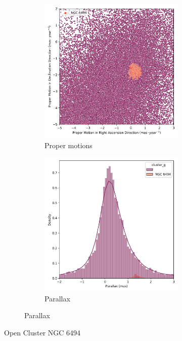 \documentclass[11pt, a4paper, english]{book}
\begin{document}
\begin{figure}[htbp]
  \centering
  \begin{subfigure}{0.9\textwidth}
    \centering
    \begin{subfigure}[t]{0.45\textwidth}
      \centering
      \includegraphics[width=\textwidth]{../figures/ngc_6494/pm_ngc_6494.png}
      \caption{Proper motions}
      \label{fig:pm_ngc_6494}
    \end{subfigure}
    \hfill
    \begin{subfigure}[t]{0.45\textwidth}
      \centering
      \includegraphics[width=\textwidth]{../figures/ngc_6494/parallax_ngc_6494.png}
      \caption{Parallax}
      \label{fig:parallax_ngc_6494}
    \end{subfigure}
  \end{subfigure}
  \caption{Open Cluster NGC 6494}
\end{figure}
\end{document}
